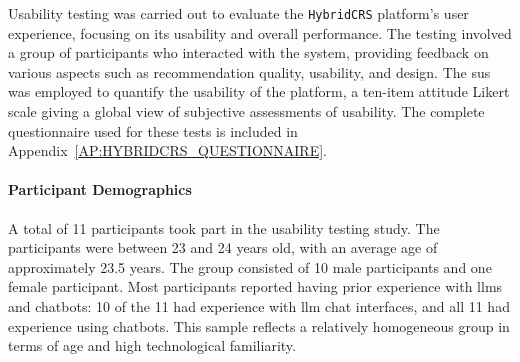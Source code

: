 Usability testing was carried out to evaluate the \texttt{HybridCRS} platform's user experience, focusing on its usability and overall performance. The testing involved a group of participants who interacted with the system, providing feedback on various aspects such as recommendation quality, usability, and design. The \acl{sus} \cite{SUS} was employed to quantify the usability of the platform, a ten-item attitude Likert scale giving a global view of subjective assessments of usability. The complete questionnaire used for these tests is included in Appendix~\ref{AP:HYBRIDCRS_QUESTIONNAIRE}.

\paragraph{Participant Demographics}
A total of 11 participants took part in the usability testing study. The participants were between 23 and 24 years old, with an average age of approximately 23.5 years. The group consisted of 10 male participants and one female participant. Most participants reported having prior experience with \acp{llm} and chatbots: 10 of the 11 had experience with \acs{llm} chat interfaces, and all 11 had experience using chatbots. This sample reflects a relatively homogeneous group in terms of age and high technological familiarity.

